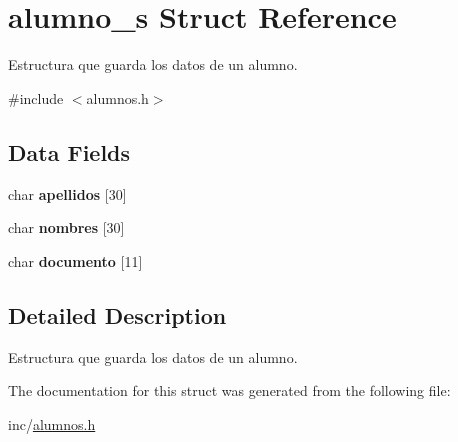 \hypertarget{structalumno__s}{}\section{alumno\+\_\+s Struct Reference}
\label{structalumno__s}


Estructura que guarda los datos de un alumno.  




{\ttfamily \#include $<$alumnos.\+h$>$}

\subsection*{Data Fields}
\begin{DoxyCompactItemize}
\item 
\mbox{\label{structalumno__s_a5e029a212d8e40bd9a9faee1bf7abfb6}} 
char {\bfseries apellidos} \mbox{[}30\mbox{]}
\item 
\mbox{\label{structalumno__s_a1f4dfcb0f32082d74e1686c35f6dde7d}} 
char {\bfseries nombres} \mbox{[}30\mbox{]}
\item 
\mbox{\label{structalumno__s_a266528572a4545fe91bdc4ef9406c38d}} 
char {\bfseries documento} \mbox{[}11\mbox{]}
\end{DoxyCompactItemize}


\subsection{Detailed Description}
Estructura que guarda los datos de un alumno. 

The documentation for this struct was generated from the following file\+:\begin{DoxyCompactItemize}
\item 
inc/\hyperlink{alumnos_8h}{alumnos.\+h}\end{DoxyCompactItemize}
